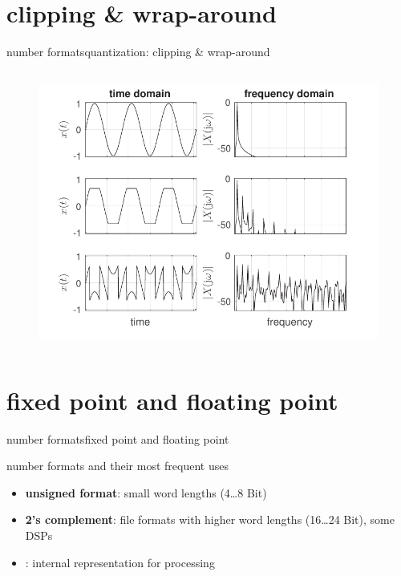 \section[clipping]{clipping \& wrap-around}
	\begin{frame}{number formats}{quantization: clipping \& wrap-around}
        \begin{columns}
	    \vspace{-10mm}
            \begin{figure}
                \centering
                    \includegraphics[scale=0.7]{Graph/wraparound}
            \end{figure}
            
            \bigskip
            \bigskip
            \bigskip
            \bigskip
             
            \bigskip
            \bigskip
            \bigskip
            \bigskip
            
        \end{columns}
	\end{frame}	
	
\section[fixed vs. float]{fixed point and floating point}
	\begin{frame}{number formats}{fixed point and floating point}
	
		number formats and their most frequent uses
		\begin{itemize}
			\item	\textbf{unsigned format}: small word lengths (4\ldots 8 Bit)
			\pause
			\item	\textbf{2's complement}: file formats with higher word lengths (16\ldots 24 Bit), some DSPs
			\pause
			\item	{}: internal representation for processing
		\end{itemize}
	\end{frame}	
	
